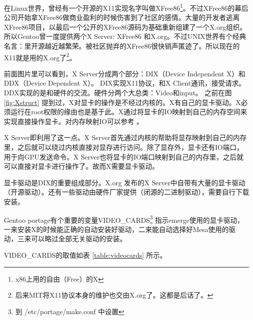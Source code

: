 
在Linux世界，曾经有一个开源的X11实现名字叫做XFree86\footnote{x86上用的自由（Free）的X}。不过XFree86的幕后公司开始拿XFree86做商业盈利的时候伤害到了社区的感情。大量的开发者逃离XFree86项目，以最后一个公开的XFree86源码为基础重新组建了一个X.org组织。所以Gentoo曾一度提供两个X Server: XFree86 和X.org。不过UNIX世界有个经典名言：里开源越近越繁荣。被社区抛弃的XFree86很快销声匿迹了。所以现在的X11就是用的X.org了\footnote{后来MIT将X11协议本身的维护也交由X.org了。这都是后话了。}。


前面图片里可以看到，X Server分成两个部分：DIX（Device Independent X）和DDX（Device Dependent X）。 DIX实现X11协议，和X Client通讯，接受请求。
DDX实现的是和硬件的交流。硬件分两个大总类：Video和input。
之前在图 \ref{fig:Xstruct} 提到过，X对显卡的操作是不经过内核的。X有自己的显卡驱动。X必须运行在root权限的缘由也是基于此。X通过将显卡的IO映射到自己的内存空间来实现直接操作显卡。对内存映射IO可以参考 。

X Server即利用了这一点。X Server首先通过内核的帮助将显存映射到自己的内存里，之后就可以绕过内核直接对显存进行访问。除了显存外，显卡还有IO端口，用于向GPU发送命令。X Server也将显卡的IO端口映射到自己的内存里，之后就可以直接对显卡进行操作了。故而X需要显卡驱动。

显卡驱动是DIX的重要组成部分。X.org 发布的X Server中自带有大量的显卡驱动（开源驱动）。还有一些驱动由硬件厂家提供（闭源的二进制驱动），需要自行下载安装。

Gentoo portage有个重要的变量VIDEO\_CARDS\footnote{到 /etc/portage/make.conf 中设置} 指示emerge使用的显卡驱动，一来安装X的时候能正确的自动安装好驱动，二来能自动选择好Mesa使用的驱动，三来可以略过全部无关驱动的安装。

VIDEO\_CARDS的取值如表 \ref{table:videocards} 所示。


